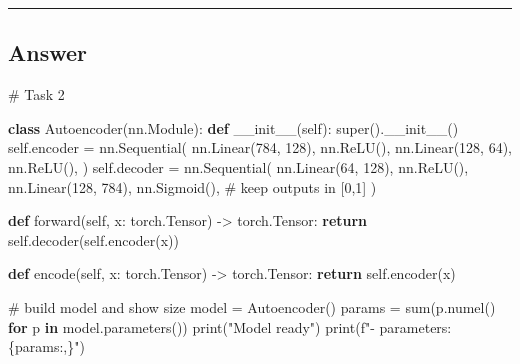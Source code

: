 \documentclass[
  letterpaper,
  DIV=11,
  numbers=noendperiod]{scrartcl}
\newenvironment{Shaded}{\begin{snugshade}}{\end{snugshade}}
\newcommand{\BuiltInTok}[1]{\textcolor[rgb]{0.00,0.23,0.31}{#1}}
\newcommand{\CommentTok}[1]{\textcolor[rgb]{0.37,0.37,0.37}{#1}}
\newcommand{\ControlFlowTok}[1]{\textcolor[rgb]{0.00,0.23,0.31}{\textbf{#1}}}
\newcommand{\DecValTok}[1]{\textcolor[rgb]{0.68,0.00,0.00}{#1}}
\newcommand{\FunctionTok}[1]{\textcolor[rgb]{0.28,0.35,0.67}{#1}}
\newcommand{\KeywordTok}[1]{\textcolor[rgb]{0.00,0.23,0.31}{\textbf{#1}}}
\newcommand{\NormalTok}[1]{\textcolor[rgb]{0.00,0.23,0.31}{#1}}
\newcommand{\OperatorTok}[1]{\textcolor[rgb]{0.37,0.37,0.37}{#1}}
\newcommand{\SpecialCharTok}[1]{\textcolor[rgb]{0.37,0.37,0.37}{#1}}
\newcommand{\SpecialStringTok}[1]{\textcolor[rgb]{0.13,0.47,0.30}{#1}}
\newcommand{\StringTok}[1]{\textcolor[rgb]{0.13,0.47,0.30}{#1}}
\newcommand{\VariableTok}[1]{\textcolor[rgb]{0.07,0.07,0.07}{#1}}
\begin{document}
\begin{center}\rule{0.5\linewidth}{0.5pt}\end{center}

\subsection{Answer}\label{answer-9}

\begin{Shaded}
\begin{Highlighting}[]
\CommentTok{\# Task 2}

\KeywordTok{class}\NormalTok{ Autoencoder(nn.Module):}
    \KeywordTok{def} \FunctionTok{\_\_init\_\_}\NormalTok{(}\VariableTok{self}\NormalTok{):}
        \BuiltInTok{super}\NormalTok{().}\FunctionTok{\_\_init\_\_}\NormalTok{()}
        \VariableTok{self}\NormalTok{.encoder }\OperatorTok{=}\NormalTok{ nn.Sequential(}
\NormalTok{            nn.Linear(}\DecValTok{784}\NormalTok{, }\DecValTok{128}\NormalTok{), nn.ReLU(),}
\NormalTok{            nn.Linear(}\DecValTok{128}\NormalTok{, }\DecValTok{64}\NormalTok{),  nn.ReLU(),}
\NormalTok{        )}
        \VariableTok{self}\NormalTok{.decoder }\OperatorTok{=}\NormalTok{ nn.Sequential(}
\NormalTok{            nn.Linear(}\DecValTok{64}\NormalTok{, }\DecValTok{128}\NormalTok{),  nn.ReLU(),}
\NormalTok{            nn.Linear(}\DecValTok{128}\NormalTok{, }\DecValTok{784}\NormalTok{), nn.Sigmoid(),  }\CommentTok{\# keep outputs in [0,1]}
\NormalTok{        )}

    \KeywordTok{def}\NormalTok{ forward(}\VariableTok{self}\NormalTok{, x: torch.Tensor) }\OperatorTok{{-}\textgreater{}}\NormalTok{ torch.Tensor:}
        \ControlFlowTok{return} \VariableTok{self}\NormalTok{.decoder(}\VariableTok{self}\NormalTok{.encoder(x))}

    \KeywordTok{def}\NormalTok{ encode(}\VariableTok{self}\NormalTok{, x: torch.Tensor) }\OperatorTok{{-}\textgreater{}}\NormalTok{ torch.Tensor:}
        \ControlFlowTok{return} \VariableTok{self}\NormalTok{.encoder(x)}

\CommentTok{\# build model and show size}
\NormalTok{model }\OperatorTok{=}\NormalTok{ Autoencoder()}
\NormalTok{params }\OperatorTok{=} \BuiltInTok{sum}\NormalTok{(p.numel() }\ControlFlowTok{for}\NormalTok{ p }\KeywordTok{in}\NormalTok{ model.parameters())}
\BuiltInTok{print}\NormalTok{(}\StringTok{"Model ready"}\NormalTok{)}
\BuiltInTok{print}\NormalTok{(}\SpecialStringTok{f"{-} parameters: }\SpecialCharTok{\{}\NormalTok{params}\SpecialCharTok{:,\}}\SpecialStringTok{"}\NormalTok{)}
\end{Highlighting}
\end{Shaded}
\end{document}
